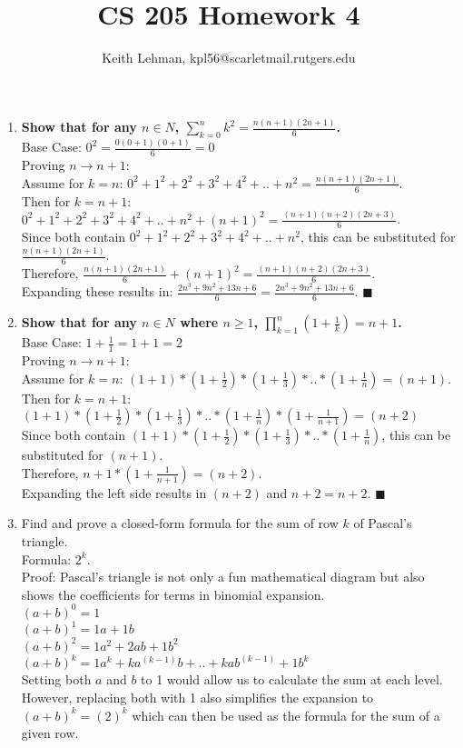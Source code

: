 \documentclass{article}
\title{CS 205 Homework 4}
\author{Keith Lehman, kpl56@scarletmail.rutgers.edu}
\begin{document}
\maketitle

\begin{enumerate}

\item \textbf{Show that for any $n \in N$, $\sum_{k=0}^{n} k^2 = \frac{n(n+1)(2n+1)}{6}$.} \\
Base Case: $0^2 = \frac{0(0+1)(0+1)}{6} = 0$ \\
Proving $n \to n+1$: \\
Assume for $k=n$: $0^2 + 1^2 + 2^2 + 3^2 + 4^2 + .. + n^2 = \frac{n(n+1)(2n+1)}{6}$. \\
Then for $k=n+1$: $0^2 + 1^2 + 2^2 + 3^2 + 4^2 + .. + n^2 + (n+1)^2 = \frac{(n+1)(n+2)(2n+3)}{6}$. \\
Since both contain $0^2 + 1^2 + 2^2 + 3^2 + 4^2 + .. + n^2$, this can be substituted for $\frac{n(n+1)(2n+1)}{6}$. \\
Therefore, $\frac{n(n+1)(2n+1)}{6} + (n+1)^2 = \frac{(n+1)(n+2)(2n+3)}{6}$. \\
Expanding these results in: $\frac{2n^3 + 9n^2 + 13n + 6}{6} = \frac{2n^3 + 9n^2 + 13n + 6}{6}$. $\blacksquare$

\item \textbf{Show that for any $n \in N$ where $n \geq 1$, $\prod_{k=1}^{n} (1 + \frac{1}{k}) = n + 1$.} \\
Base Case: $1+\frac{1}{1} = 1 + 1 = 2$ \\ 
Proving $n \to n+1$: \\
Assume for $k=n$: $(1+1) * (1+\frac{1}{2}) * (1+\frac{1}{3}) * .. * (1+\frac{1}{n}) = (n+1)$. \\
Then for $k=n+1$: $(1+1) * (1+\frac{1}{2}) * (1+\frac{1}{3}) * .. * (1+\frac{1}{n}) * (1+\frac{1}{n+1})= (n+2)$ \\
Since both contain $(1+1) * (1+\frac{1}{2}) * (1+\frac{1}{3}) * .. * (1+\frac{1}{n})$, this can be substituted for $(n+1)$. \\
Therefore, $n+1 * (1+\frac{1}{n+1}) = (n+2)$. \\
Expanding the left side results in $(n+2)$ and $n+2 = n+2$. $\blacksquare$

\item Find and prove a closed-form formula for the sum of row $k$ of Pascal's triangle. \\
Formula: $2^k$. \\
Proof: Pascal's triangle is not only a fun mathematical diagram but also shows the coefficients for terms in binomial expansion. \\
$(a+b)^0 = 1$ \\
$(a+b)^1 = 1a + 1b$ \\
$(a+b)^2 = 1a^2 + 2ab + 1b^2$ \\
$(a+b)^k = 1a^k + ka^{(k-1)} b + .. + kab^{(k-1)} + 1b^k$ \\
Setting both $a$ and $b$ to 1 would allow us to calculate the sum at each level. However, replacing both with 1 also simplifies the expansion to $(a+b)^k = (2)^k$ which can then be used as the formula for the sum of a given row. \\


\end{enumerate}
\end{document}
